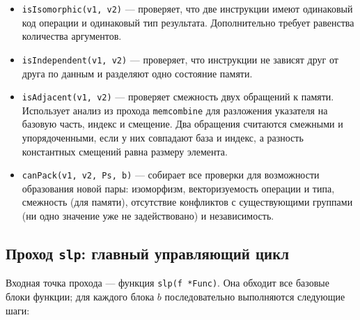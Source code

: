 \begin{itemize}
    \item \texttt{isIsomorphic(v1, v2)} --- проверяет, что две инструкции имеют одинаковый код операции и одинаковый тип результата. 
    Дополнительно требует равенства количества аргументов.
    
    \item \texttt{isIndependent(v1, v2)} --- проверяет, что инструкции не зависят друг от друга по данным и разделяют одно состояние памяти.
    
    \item \texttt{isAdjacent(v1, v2)} --- проверяет смежность двух обращений к памяти. 
    Использует анализ из прохода \texttt{memcombine} для разложения указателя на базовую часть, индекс и смещение. 
    Два обращения считаются смежными и упорядоченными, если у них совпадают база и индекс, а разность константных смещений равна размеру элемента.
    
    \item \texttt{canPack(v1, v2, Ps, b)} --- собирает все проверки для возможности образования новой пары: изоморфизм, 
    векторизуемость операции и типа, смежность (для памяти), отсутствие конфликтов с существующими группами (ни одно значение уже не задействовано) и независимость.
\end{itemize}

\subsection{Проход \texttt{slp}: главный управляющий цикл}
\label{sec:main_loop}

Входная точка прохода --- функция \texttt{slp(f *Func)}. Она обходит все базовые блоки функции; для каждого блока \(b\) последовательно выполняются следующие шаги:

